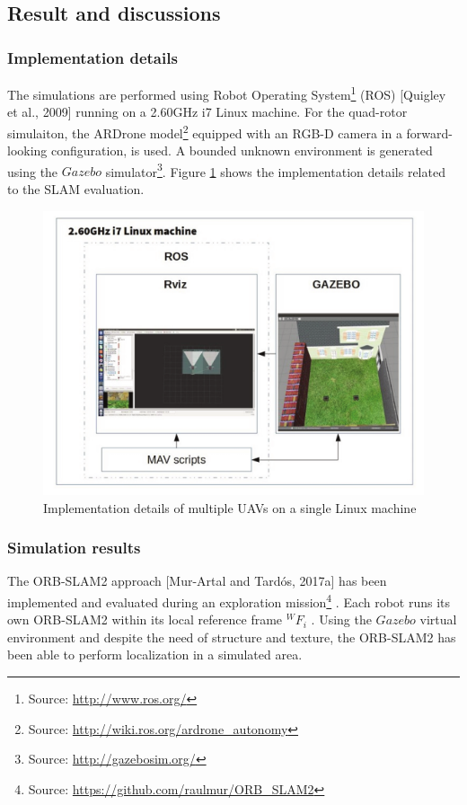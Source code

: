 \subsection{Result and discussions}
\subsubsection{Implementation details}
The simulations are performed using Robot Operating System\footnote{Source: \url{http://www.ros.org/}} (ROS) [Quigley et al., 2009] running on a 2.60GHz i7 Linux machine. For the quad-rotor simulaiton, the ARDrone model\footnote{Source: \url{http://wiki.ros.org/ardrone_autonomy}} equipped with an RGB-D camera in a forward-looking configuration, is used. A bounded unknown environment is generated using the $Gazebo$ simulator\footnote{Source: \url{http://gazebosim.org/}}. Figure \ref{fig:2.21} shows the implementation details related to the SLAM evaluation.
\begin{figure}[H]
    \centering
    \includegraphics[scale=0.5]{assets/2_21.png}
    \caption{Implementation details of multiple UAVs on a single Linux machine}
    \label{fig:2.21}
\end{figure}
\subsubsection{Simulation results}
The ORB-SLAM2 approach [Mur-Artal and Tardós, 2017a] has been implemented and evaluated during an exploration mission\footnote{Source: \url{https://github.com/raulmur/ORB_SLAM2}} . Each robot runs its own ORB-SLAM2 within its local reference frame $^WF_i$ . Using the $Gazebo$ virtual environment and despite the need of structure and texture, the ORB-SLAM2 has been able to perform localization in a simulated area.
